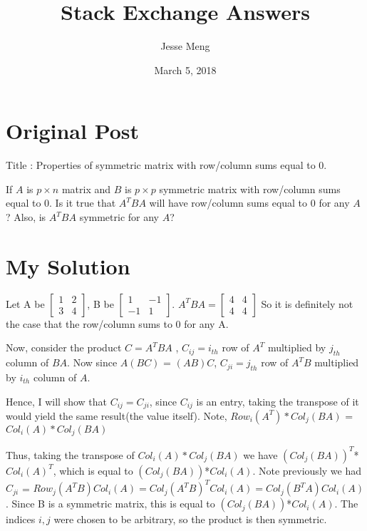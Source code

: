 \documentclass{article}
\title{Stack Exchange Answers}
\author{Jesse Meng }
\date{March 5, 2018}
\begin{document}
\maketitle

\section{Original Post}
Title : Properties of symmetric matrix with row/column sums equal to 0.

If $A$ is $p\times n$ matrix and $B$ is $p\times p$ symmetric matrix  with row/column sums equal to $0$. 
Is it true that $A^TBA$ will have row/column sums equal to $0$ for any $A$?
Also, is $A^TBA$ symmetric for any $A$?


\section{My Solution}
Let A be $\begin{bmatrix} 1&2 \\ 3&4\end{bmatrix}$, B be $\begin{bmatrix} 1&-1 \\ -1&1\end{bmatrix}$. $A^TBA = \begin{bmatrix} 4&4 \\ 4&4\end{bmatrix}$
So it is definitely not the case that the row/column sums to 0 for any A.

Now, consider the product $C=A^TBA$ , $C_{ij} = i_{th}$ row of $A^T$ multiplied by $j_{th}$ column of $BA$. Now since $A(BC)$ = $(AB)C$,   $C_{ji} = j_{th}$ row of $A^TB$ multiplied by $i_{th}$ column of $A$. 

Hence, I will show that  $C_{ij}=C_{ji}$, since  $C_{ij}$ is an entry, taking the transpose of it would yield the same result(the value itself). Note, $Row_i(A^T)*Col_j(BA)$ = $Col_i(A)*Col_j(BA)$

Thus, taking the transpose of $Col_i(A)*Col_j(BA)$ we have $(Col_j(BA))^T$*$Col_i(A)^T$, which is equal to $(Col_j(BA))$*$Col_i(A)$.  
Note previously we had $C_{ji}$ = $Row_j(A^TB)Col_i(A) = Col_j(A^TB)^TCol_i(A)=Col_j(B^TA)Col_i(A)$. Since B is a symmetric matrix, this is equal to $(Col_j(BA))$*$Col_i(A)$. The indices $i,j$ were chosen to be arbitrary, so the product is then symmetric.
\end{document}
